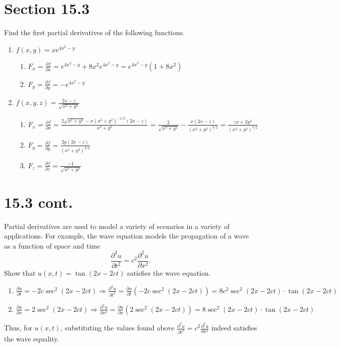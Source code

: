 \documentclass[letter,11pt]{article}
\begin{document}
\section*{Section 15.3}
Find the first partial derivatives of the following functions.
\begin{enumerate}
    \item $f(x,y)=xe^{4x^2-y}$
        \begin{enumerate}
            \item $F_x = \frac{\partial f}{\partial x} = e^{4x^2-y}+ 8x^2e^{4x^2-y} = e^{4x^2-y}(1+8x^2)$
            \item $F_y = \frac{\partial f}{\partial y} = -e^{4x^2-y}$
        \end{enumerate}
    \item $f(x,y,z) = \frac{2x-z}{\sqrt{x^2+y^2}}$
        \begin{enumerate}
            \item $F_x=  \frac{\partial f}{\partial x} = \frac{2\sqrt{x^2+y^2}-x(x^2+y^2)^{-1/2}(2x-z)}{x^2+y^2} = \frac{2}{\sqrt{x^2+y^2}} - \frac{x(2x-z)}{(x^2+y^2)^{3/2}} = \frac{zx+2y^2}{(x^2+y^2)^{3/2}}$
            \item $F_y=  \frac{\partial f}{\partial y} = \frac{2y(2x-z)}{(x^2+y^2)^{3/2}}$
            \item $F_z=  \frac{\partial f}{\partial z} = \frac{-1}{\sqrt{x^2+y^2}}$
        \end{enumerate}
\end{enumerate}
\section*{15.3 cont.}
Partial derivatives are used to model a variety of scenarios in a variety of applications. For example, the wave equation models the propagation of a wave as a function of space and time
$$\frac{\partial^2u}{\partial t^2} = c^2\frac{\partial^2u}{\partial x^2}.$$
Show that $u(x, t) = \tan(2x - 2ct)$ satisfies the wave equation.
\begin{enumerate}
    \item $\frac{\partial u}{\partial t} = -2c\sec^2(2x-2ct) \Longrightarrow \frac{\partial^2 u}{\partial t^2}= \frac{\partial u}{\partial t}\left(-2c\sec^2(2x-2ct)\right) = 8c^2\sec^2(2x-2ct)\cdot \tan(2x-2ct)$
    \item $\frac{\partial u}{\partial x} = 2\sec^2(2x-2ct) \Longrightarrow \frac{\partial^2 u}{\partial x^2}= \frac{\partial u}{\partial x}\left(2\sec^2(2x-2ct)\right) = 8\sec^2(2x-2ct)\cdot \tan(2x-2ct)$
\end{enumerate}
Thus, for $u(x,t)$, substituting the values found above $\frac{\partial^2u}{\partial t^2} = c^2\frac{\partial^2u}{\partial x^2}$ indeed satisfies the wave equality.
\end{document}
